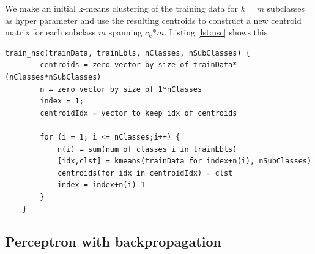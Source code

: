 \documentclass[journal]{IEEEtran}
\begin{document}
We make an initial k-means clustering of the training data for $k=m$ subclasses as hyper parameter and use the resulting centroids to construct a new centroid matrix for each subclass $m$ spanning $c_{k}$*$m$. Listing \ref{lst:nsc} shows this.

\begin{minipage}[H]{0.95\linewidth}
	\begin{lstlisting}[caption=Implementation of NSC., label={lst:nsc}]
	train_nsc(trainData, trainLbls, nClasses, nSubClasses) {
		centroids = zero vector by size of trainData*(nClasses*nSubClasses)
		n = zero vector by size of 1*nClasses
		index = 1;
		centroidIdx = vector to keep idx of centroids
	
		for (i = 1; i <= nClasses;i++) {
			n(i) = sum(num of classes i in trainLbls)
			[idx,clst] = kmeans(trainData for index+n(i), nSubClasses)
			centroids(for idx in centroidIdx) = clst
			index = index+n(i)-1
		}
	}
	\end{lstlisting}
\end{minipage}

\subsection{Perceptron with backpropagation} 






















 
\end{document}

